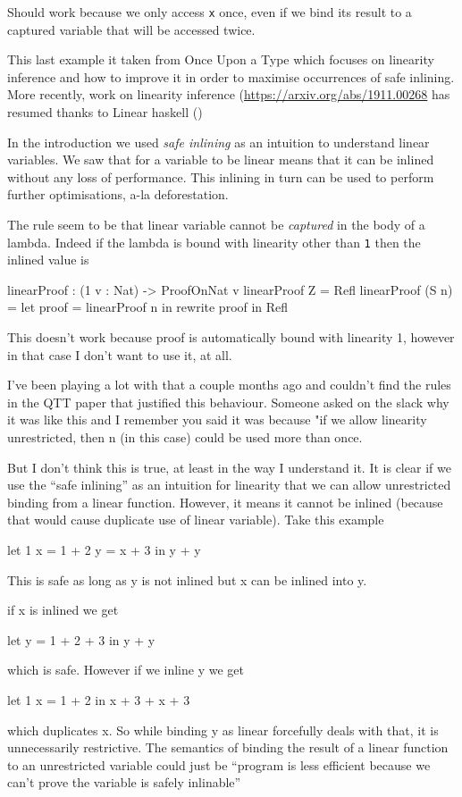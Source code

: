 \documentclass[
]{article}
\begin{document}
Should work because we only access \texttt{x} once, even if we bind its
result to a captured variable that will be accessed twice.

This last example it taken from Once Upon a Type which focuses on
linearity inference and how to improve it in order to maximise
occurrences of safe inlining. More recently, work on linearity inference
(\url{https://arxiv.org/abs/1911.00268} has resumed thanks to Linear
haskell ()

In the introduction we used \emph{safe inlining} as an intuition to
understand linear variables. We saw that for a variable to be linear
means that it can be inlined without any loss of performance. This
inlining in turn can be used to perform further optimisations, a-la
deforestation.

The rule seem to be that linear variable cannot be \emph{captured} in
the body of a lambda. Indeed if the lambda is bound with linearity other
than \texttt{1} then the inlined value is

linearProof : (1 v : Nat) -\textgreater{} ProofOnNat v linearProof Z =
Refl linearProof (S n) = let proof = linearProof n in rewrite proof in
Refl

This doesn't work because proof is automatically bound with linearity 1,
however in that case I don't want to use it, at all.

I've been playing a lot with that a couple months ago and couldn't find
the rules in the QTT paper that justified this behaviour. Someone asked
on the slack why it was like this and I remember you said it was because
"if we allow linearity unrestricted, then n (in this case) could be used
more than once.

But I don't think this is true, at least in the way I understand it. It
is clear if we use the ``safe inlining'' as an intuition for linearity
that we can allow unrestricted binding from a linear function. However,
it means it cannot be inlined (because that would cause duplicate use of
linear variable). Take this example

let 1 x = 1 + 2 y = x + 3 in y + y

This is safe as long as y is not inlined but x can be inlined into y.

if x is inlined we get

let y = 1 + 2 + 3 in y + y

which is safe. However if we inline y we get

let 1 x = 1 + 2 in x + 3 + x + 3

which duplicates x. So while binding y as linear forcefully deals with
that, it is unnecessarily restrictive. The semantics of binding the
result of a linear function to an unrestricted variable could just be
``program is less efficient because we can't prove the variable is
safely inlinable''
\end{document}
